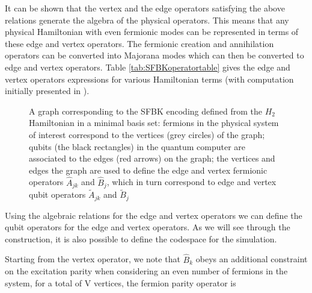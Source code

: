 It can be shown that the vertex and the edge operators satisfying the above relations generate the algebra of the physical operators. This means that any physical Hamiltonian with even fermionic modes can be represented in terms of these edge and vertex operators. The fermionic creation and annihilation operators can be converted into Majorana modes which can then be converted to edge and vertex operators. Table \ref{tab:SFBKoperatortable} gives the edge and vertex operators expressions for various Hamiltonian terms (with computation initially presented in \cite{Setia2018}). 
\begin{figure} [h]
\centering
{}
\caption{A graph corresponding to the SFBK encoding defined from the $H_2$ Hamiltonian in a minimal basis set: fermions in the physical system of interest correspond to the vertices (grey circles) of the graph; qubits (the black rectangles) in the quantum computer are associated to the edges (red arrows) on the graph; the vertices and edges the graph are used to define the edge and vertex fermionic operators $\hat{A}_{jk}$ and $\hat{B}_j$, which in turn correspond to edge and vertex qubit operators $\tilde{A}_{jk}$ and $\tilde{B}_j$}
\label{fig:h2moleculegraph1}
\end{figure}
Using the algebraic relations for the edge and vertex operators we can define the qubit operators for the edge and vertex operators. As we will see through the construction, it is also possible to define the codespace for the simulation.

Starting from the vertex operator, we note that $\hat{B}_k$ obeys an additional constraint on the excitation parity when considering an even number of fermions in the system, for a total of $\mathrm{V}$ vertices, the fermion parity operator is

